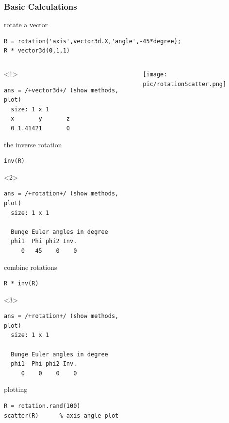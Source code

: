 \documentclass[compress]{beamer}
\begin{document}
\begin{frame}[fragile]
  \frametitle{Basic Calculations}

    rotate a vector
    \begin{lstlisting}[style=input]
R = rotation('axis',vector3d.X,'angle',-45*degree);
R * vector3d(0,1,1)
    \end{lstlisting}


  \begin{columns}
    \begin{column}{8cm}
  \begin{overlayarea}{8cm}{8cm}
\begin{onlyenv}<1>
  \vspace{-0.3cm}
\begin{lstlisting}[style=output]
ans = /+vector3d+/ (show methods, plot)
  size: 1 x 1
  x       y       z
  0 1.41421       0
  \end{lstlisting}
\end{onlyenv}

\pause
 \medskip

 the inverse rotation
 \begin{lstlisting}[style=input]
 inv(R)
 \end{lstlisting}
 \begin{onlyenv}<2>
   \vspace{-0.3cm}
  \begin{lstlisting}[style=output]
ans = /+rotation+/ (show methods, plot)
  size: 1 x 1

  Bunge Euler angles in degree
  phi1  Phi phi2 Inv.
     0   45    0    0
  \end{lstlisting}
 \end{onlyenv}

 \pause
 \medskip

 combine rotations
 \begin{lstlisting}[style=input]
R * inv(R)
\end{lstlisting}

\begin{onlyenv}<3>
  \vspace{-0.3cm}
  \begin{lstlisting}[style=output]
ans = /+rotation+/ (show methods, plot)
  size: 1 x 1

  Bunge Euler angles in degree
  phi1  Phi phi2 Inv.
     0    0    0    0
  \end{lstlisting}
\end{onlyenv}

\pause
\medskip

plotting
\begin{lstlisting}[style=input]
R = rotation.rand(100)
scatter(R)      % axis angle plot
\end{lstlisting}

\end{overlayarea}
\end{column}

\begin{column}{3.7cm}
  \texttt{[image: pic/rotationScatter.png]}
\end{column}

\end{columns}

\end{frame}
\end{document}
